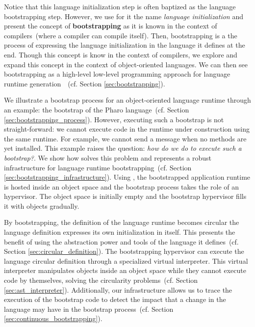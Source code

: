 Notice that this language initialization step is often baptized as the language bootstrapping step. However, we use for it the name \emph{language initialization} and present the concept of \textbf{bootstrapping} as it is known in the context of compilers~(where a compiler can compile itself). Then, bootstrapping is a the process of expressing the language initialization in the language it defines at the end. Though this concept is know in the context of compilers, we explore and expand this concept in the context of object-oriented languages. We can then see bootstrapping as a high-level low-level programming approach for  language runtime generation~\cite{Fram09a}~(cf. Section \ref{sec:bootstrapping}).


We illustrate a bootstrap process for an object-oriented language runtime through an example: the bootstrap of the Pharo language~(cf. Section \ref{sec:bootstrapping_process}).
However, executing such a bootstrap is not straight-forward: we cannot execute code in the runtime under construction using the same runtime. For example, we cannot send a message when no methods are yet installed.
This example raises the question: \emph{how do we do to execute such a bootstrap?}. We show how \Vtt solves this problem and represents a robust infrastructure for language runtime bootstrapping~(cf. Section \ref{sec:bootstrapping_infrastructure}). Using \Vtt, the bootstrapped application runtime is hosted inside an object space and the bootstrap process takes the role of an hypervisor. The object space is initially empty and the bootstrap hypervisor fills it with objects gradually. 

By bootstrapping, the definition of the language runtime becomes circular \ie the language definition expresses its own initialization in itself. This presents the benefit of using the abstraction power and tools of the language it defines~(cf. Section \ref{sec:circular_definition}).
The bootstrapping hypervisor can execute the language circular definition through a specialized virtual interpreter. This virtual interpreter manipulates objects inside an object space while they cannot execute code by themselves, solving the circularity problems~(cf. Section \ref{sec:ast_interpreter}). Additionally, our infrastructure allows us to trace the execution of the bootstrap code to detect the impact that a change in the language may have in the bootstrap process~(cf. Section \ref{sec:continuous_bootstrapping}).

